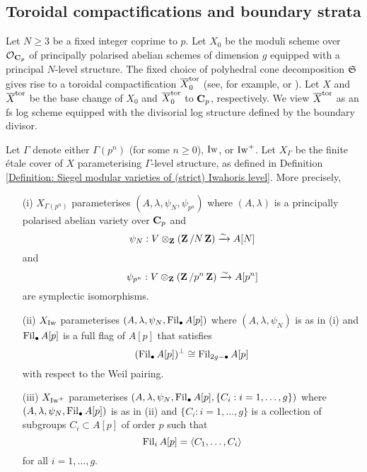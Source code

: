 \subsection{Toroidal compactifications and boundary strata}\label{subsection: boundary strata}
Let $N\geq 3$ be a fixed integer coprime to $p$. Let $X_0$ be the moduli scheme over $\operatorname{\mathcal{O}}_{\operatorname{\mathbf{C}}_p}$ of principally polarised abelian schemes of dimension $g$ equipped with a principal $N$-level structure. The fixed choice of polyhedral cone decomposition $\operatorname{\mathfrak{S}}$ gives rise to a toroidal compactification $\overline{X}_0^{\operatorname{tor}}$ (see, for example, \cite[Chapter IV, \S 4]{Faltings-Chai} or \cite[\S 3.2]{Stroh-TorComp}). Let $X$ and $\overline{X}^{\operatorname{tor}}$ be the base change of $X_0$ and $\overline{X}_0^{\operatorname{tor}}$ to $\operatorname{\mathbf{C}}_p$, respectively. We view $\overline{X}^{\operatorname{tor}}$ as an fs log scheme equipped with the divisorial log structure defined by the boundary divisor.

Let $\Gamma$ denote either $\Gamma(p^n)$ (for some $n\geq 0$), $\operatorname{Iw}$, or $\operatorname{Iw}^+$. Let $X_{\Gamma}$ be the finite \'etale cover of $X$ parameterising $\Gamma$-level structure, as defined in Definition \ref{Definition: Siegel modular varieties of (strict) Iwahoris level}. More precisely, 
\begin{enumerate}
\item[(i)] $X_{\Gamma(p^n)}$ parameterises $(A, \lambda, \psi_N, \psi_{p^n})$ where $(A, \lambda)$ is a principally polarised abelian variety over $\operatorname{\mathbf{C}}_p$ and $$\psi_N:V\otimes_{\operatorname{\mathbf{Z}}}(\operatorname{\mathbf{Z}}/N\operatorname{\mathbf{Z}})\xrightarrow[]{\sim} A[N]$$ and $$\psi_{p^n}:V\otimes_{\operatorname{\mathbf{Z}}}(\operatorname{\mathbf{Z}}/p^n\operatorname{\mathbf{Z}})\xrightarrow[]{\sim}A[p^n]$$
are symplectic isomorphisms.
\item[(ii)] $X_{\operatorname{Iw}}$ parameterises $(A, \lambda, \psi_N, \operatorname{Fil}_{\bullet}A[p])$ where $(A, \lambda, \psi_N)$ is as in (i) and $\operatorname{Fil}_{\bullet}A[p]$ is a full flag of $A[p]$ that satisfies
$$(\operatorname{Fil}_{\bullet}A[p])^{\perp}\cong \operatorname{Fil}_{2g-\bullet}A[p]$$
with respect to the Weil pairing.
\item[(iii)] $X_{\operatorname{Iw}^+}$ parameterises $(A, \lambda, \psi_N, \operatorname{Fil}_{\bullet}A[p], \{C_i:i=1, \ldots, g\})$ where $(A, \lambda, \psi_N, \operatorname{Fil}_{\bullet}A[p])$ is as in (ii) and $\{C_i:i=1, \ldots, g\}$ is a collection of subgroups $C_i\subset A[p]$ of order $p$ such that
$$\operatorname{Fil}_iA[p]=\langle C_1, \ldots, C_i\rangle$$
for all $i=1, \ldots, g$.
\end{enumerate}

